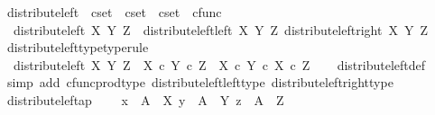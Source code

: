 \begin{isabellebody}
\endisatagproof
{\isafoldproof}%
%
\isadelimproof
\isanewline
%
\endisadelimproof
\isanewline
{}\isamarkupfalse%
\ distribute{\isacharunderscore}{\kern0pt}left\ {\isacharcolon}{\kern0pt}{\isacharcolon}{\kern0pt}\ {\isachardoublequoteopen}cset\ {\isasymRightarrow}\ cset\ {\isasymRightarrow}\ cset\ {\isasymRightarrow}\ cfunc{\isachardoublequoteclose}\ \isanewline
\ \ {\isachardoublequoteopen}distribute{\isacharunderscore}{\kern0pt}left\ X\ Y\ Z\ {\isacharequal}{\kern0pt}\ {\isasymlangle}distribute{\isacharunderscore}{\kern0pt}left{\isacharunderscore}{\kern0pt}left\ X\ Y\ Z{\isacharcomma}{\kern0pt}\ distribute{\isacharunderscore}{\kern0pt}left{\isacharunderscore}{\kern0pt}right\ X\ Y\ Z{\isasymrangle}{\isachardoublequoteclose}\isanewline
\isanewline
{}\isamarkupfalse%
\ distribute{\isacharunderscore}{\kern0pt}left{\isacharunderscore}{\kern0pt}type{\isacharbrackleft}{\kern0pt}type{\isacharunderscore}{\kern0pt}rule{\isacharbrackright}{\kern0pt}{\isacharcolon}{\kern0pt}\isanewline
\ \ {\isachardoublequoteopen}distribute{\isacharunderscore}{\kern0pt}left\ X\ Y\ Z\ {\isacharcolon}{\kern0pt}\ X\ {\isasymtimes}\isactrlsub c\ {\isacharparenleft}{\kern0pt}Y\ {\isasymtimes}\isactrlsub c\ Z{\isacharparenright}{\kern0pt}\ {\isasymrightarrow}\ {\isacharparenleft}{\kern0pt}X\ {\isasymtimes}\isactrlsub c\ Y{\isacharparenright}{\kern0pt}\ {\isasymtimes}\isactrlsub c\ {\isacharparenleft}{\kern0pt}X\ {\isasymtimes}\isactrlsub c\ Z{\isacharparenright}{\kern0pt}{\isachardoublequoteclose}\isanewline
%
\isadelimproof
\ \ %
\endisadelimproof
%
\isatagproof
{}\isamarkupfalse%
\ distribute{\isacharunderscore}{\kern0pt}left{\isacharunderscore}{\kern0pt}def\isanewline
\ \ \isamarkupfalse%
\ {\isacharparenleft}{\kern0pt}simp\ add{\isacharcolon}{\kern0pt}\ cfunc{\isacharunderscore}{\kern0pt}prod{\isacharunderscore}{\kern0pt}type\ distribute{\isacharunderscore}{\kern0pt}left{\isacharunderscore}{\kern0pt}left{\isacharunderscore}{\kern0pt}type\ distribute{\isacharunderscore}{\kern0pt}left{\isacharunderscore}{\kern0pt}right{\isacharunderscore}{\kern0pt}type{\isacharparenright}{\kern0pt}%
\endisatagproof
{\isafoldproof}%
%
\isadelimproof
\isanewline
%
\endisadelimproof
\isanewline
{}\isamarkupfalse%
\ distribute{\isacharunderscore}{\kern0pt}left{\isacharunderscore}{\kern0pt}ap{\isacharcolon}{\kern0pt}\ \isanewline
\ \ \ {\isachardoublequoteopen}x\ {\isacharcolon}{\kern0pt}\ A\ {\isasymrightarrow}\ X{\isachardoublequoteclose}\ {\isachardoublequoteopen}y\ {\isacharcolon}{\kern0pt}\ A\ {\isasymrightarrow}\ Y{\isachardoublequoteclose}\ {\isachardoublequoteopen}z\ {\isacharcolon}{\kern0pt}\ A\ {\isasymrightarrow}\ Z{\isachardoublequoteclose}\isanewline

\end{isabellebody}
